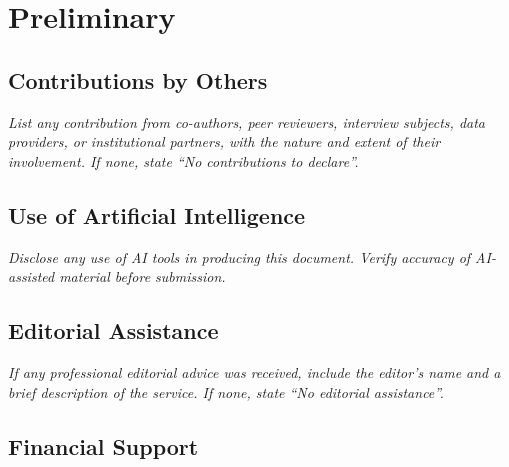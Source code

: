 
\chapter*{Preliminary}

\section*{Contributions by Others}

\noindent
\textit{List any contribution from co-authors, peer reviewers, interview
  subjects, data providers, or institutional partners, with the nature
  and extent of their involvement. If none, state ``No contributions to
declare''.}

\section*{Use of Artificial Intelligence}

\noindent
\textit{Disclose any use of AI tools in producing this document. Verify
accuracy of AI-assisted material before submission.}

\section*{Editorial Assistance}

\noindent
\textit{If any professional editorial advice was received, include the
  editor's name and a brief description of the service. If none, state
``No editorial assistance''.}

\section*{Financial Support}

